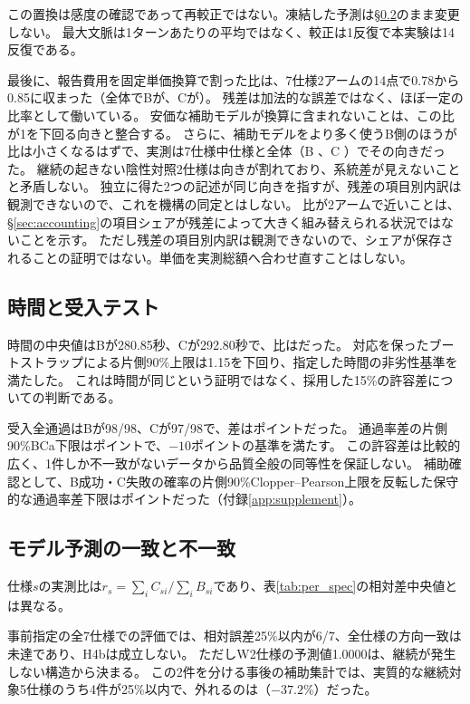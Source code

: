 \documentclass[a4paper,11pt]{article}
\newcommand{\spec}[1]{\texttt{\detokenize{#1}}}
\begin{document}
この置換は感度の確認であって再較正ではない。凍結した予測は\S\ref{sec:model_fit}のまま変更しない。
最大文脈は1ターンあたりの平均ではなく、較正は1反復で本実験は14反復である。

最後に、報告費用を固定単価換算で割った比は、7仕様2アームの14点で0.78から0.85に収まった（全体でBが\ResidualRatioB、Cが\ResidualRatioC）。
残差は加法的な誤差ではなく、ほぼ一定の比率として働いている。
安価な補助モデルが換算に含まれないことは、この比が1を下回る向きと整合する。
さらに、補助モデルをより多く使うB側のほうが比は小さくなるはずで、実測は7仕様中\ResidualDirSpecs 仕様と全体（B \ResidualRatioB、C \ResidualRatioC）でその向きだった。
継続の起きない陰性対照2仕様は向きが割れており、系統差が見えないことと矛盾しない。
独立に得た2つの記述が同じ向きを指すが、残差の項目別内訳は観測できないので、これを機構の同定とはしない。
比が2アームで近いことは、\S\ref{sec:accounting}の項目シェアが残差によって大きく組み替えられる状況ではないことを示す。
ただし残差の項目別内訳は観測できないので、シェアが保存されることの証明ではない。単価を実測総額へ合わせ直すことはしない。

\subsection{時間と受入テスト}\label{sec:time_quality}
時間の中央値はBが280.85秒、Cが292.80秒で、比は\TimeRatio{}だった。
対応を保ったブートストラップによる片側90\%上限\TimeUpper{}は1.15を下回り、指定した時間の非劣性基準を満たした。
これは時間が同じという証明ではなく、採用した15\%の許容差についての判断である。

受入全通過はBが98/98、Cが97/98で、差は\QualityDiff{}ポイントだった。
通過率差の片側90\%BCa下限は\QualityLower{}ポイントで、$-10$ポイントの基準を満たす。
この許容差は比較的広く、1件しか不一致がないデータから品質全般の同等性を保証しない。
補助確認として、B成功・C失敗の確率の片側90\%Clopper--Pearson上限を反転した保守的な通過率差下限は\QualityExact{}ポイントだった（付録\ref{app:supplement}）。

\subsection{モデル予測の一致と不一致}\label{sec:model_fit}
仕様$s$の実測比は$r_s=\sum_i C_{si}/\sum_i B_{si}$であり、表\ref{tab:per_spec}の相対差中央値とは異なる。
\begin{table}[!htbp]
\centering\small

\caption{固定した予測との比較。相対誤差は$(r_s-\widehat r_s)/\widehat r_s$。等値の予測1.0000は増加の予測ではない。}
\label{tab:model}
\end{table}
事前指定の全7仕様での評価では、相対誤差25\%以内が6/7、全仕様の方向一致は未達であり、H4bは成立しない。
ただしW2仕様の予測値1.0000は、継続が発生しない構造から決まる。
この2件を分ける事後の補助集計では、実質的な継続対象5仕様のうち4件が25\%以内で、外れるのは\spec{n_db_chain}（$-37.2$\%）だった。
\end{document}
